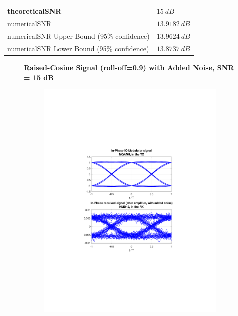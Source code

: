 \begin{refsection}
\begin{table}[H]
\begin{tabular}{|l|l|}
		theoreticalSNR  	   & $15~dB$                             					\\ \hline
		numericalSNR 		   & $13.9182~dB$                             					\\ \hline
		numericalSNR Upper Bound (95\% confidence) & $13.9624~dB$                             					\\ \hline
		numericalSNR Lower Bound (95\% confidence) & $13.8737~dB$                             					\\ \hline
	\end{tabular}
\end{table}
\begin{figure}[H]
		\centering
	\textbf{Raised-Cosine Signal (roll-off=0.9) with Added Noise, SNR = 15 dB}
	\begin{minipage}{\linewidth}
		\centering
	\begin{subfigure}{.45\textwidth}
		\centering
		\includegraphics[clip, trim=4cm 7cm 4cm 7cm, 
		width=\textwidth]{./sdf/m_qam_system/figures/eyes/simulRc09Sp45Np60_i.pdf}

\end{subfigure}
\end{minipage}
\end{figure}
\end{refsection}
